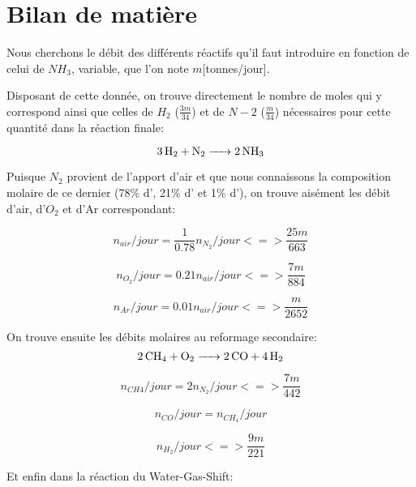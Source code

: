 \documentclass[a4paper, oneside, 12pt]{article}
\begin{document}
\section{Bilan de matière}

Nous cherchons le débit des différents réactifs qu'il faut introduire en fonction de celui de $NH_3$, variable, que l'on note $m$[tonnes/jour].

Disposant de cette donnée, on trouve directement le nombre de moles qui y correspond ainsi que celles de $H_2$ ($\frac{3m}{34}$) et de $N-2$ ($\frac{m}{34}$) nécessaires  pour cette quantité dans la réaction finale:

\begin{equation*}
	\ce{3H2 + N2 -> 2NH3}
\end{equation*}

Puisque $N_2$ provient de l'apport d'air et que nous connaissons la composition molaire 
de ce dernier (78\% d', 21\% d' et 1\% d'), 
on trouve aisément les débit d'air, d'$O_2$ et d'Ar correspondant:

\begin{equation}
	n_{air}/jour=\frac{1}{0.78} n_{N_2}/jour <=> \frac{25 m}{663}
\end{equation}

\begin{equation}
	n_{O_2}/jour=0.21 n_{air}/jour <=> \frac{7 m}{884}
\end{equation}

\begin{equation}
	n_{Ar}/jour=0.01 n_{air}/jour <=> \frac{m}{2652}
\end{equation}

On trouve ensuite les débits molaires au reformage secondaire:
\begin{equation*}
	\ce{2CH4 + O2 -> 2CO + 4H2}
\end{equation*}

\begin{equation}
	n_{CH4}/jour=2 n_{N_2}/jour <=> \frac{7 m}{442}
\end{equation}

\begin{equation}
	n_{CO}/jour=n_{CH_4}/jour
\end{equation}

\begin{equation}
	n_{H_2}/jour <=> \frac{9m}{221}
\end{equation}

Et enfin dans la réaction du Water-Gas-Shift:
\end{document}

